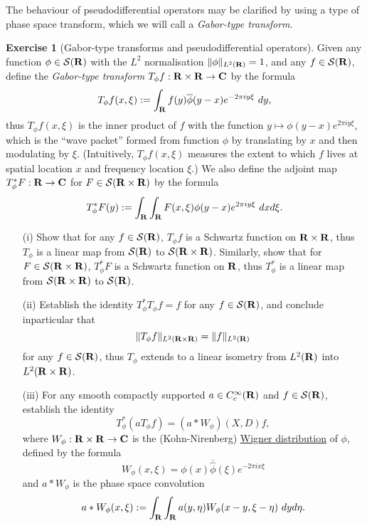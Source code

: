 \documentclass[11pt]{article}
\theoremstyle{definition}
\newtheorem{exercise}[theorem]{Exercise}
\begin{document}
The behaviour of pseudodifferential operators may be clarified by using a type of phase space transform, which we will call a \emph{Gabor-type transform}.

\begin{exercise}[Gabor-type transforms and pseudodifferential operators]
 \label{gabor} Given any function \({\phi \in {\mathcal S}({\bf R})}\) with the \({L^2}\) normalisation \({\|\phi\|_{L^2({\bf R})}=1}\), and any \({f \in {\mathcal S}({\bf R})}\), define the \emph{Gabor-type transform} \({T_\phi f: {\bf R} \times {\bf R} \rightarrow {\bf C}}\) by the formula 
\[\displaystyle  T_\phi f(x,\xi) := \int_{\bf R} f(y) \overline{\phi}(y-x) e^{-2\pi i y \xi}\ dy,\]
 thus \({T_\phi f(x,\xi)}\) is the inner product of \({f}\) with the function \({y \mapsto \phi(y-x) e^{2\pi i y \xi}}\), which is the “wave packet” formed from function \({\phi}\) by translating by \({x}\) and then modulating by \({\xi}\). (Intuitively, \({T_\phi f(x,\xi)}\) measures the extent to which \({f}\) lives at spatial location \({x}\) and frequency location \({\xi}\).) We also define the adjoint map \({T_\phi^* F: {\bf R} \rightarrow {\bf C}}\) for \({F \in {\mathcal S}({\bf R} \times {\bf R})}\) by the formula 
\[\displaystyle  T_\phi^* F(y) := \int_{\bf R} \int_{\bf R} F(x,\xi) \phi(y-x) e^{2\pi i y \xi}\ dx d\xi.\]
\begin{itemize}

\item[(i)] Show that for any \({f \in {\mathcal S}({\bf R})}\), \({T_\phi f}\) is a Schwartz function on \({{\bf R} \times {\bf R}}\), thus \({T_\phi}\) is a linear map from \({{\mathcal S}({\bf R})}\) to \({{\mathcal S}({\bf R} \times {\bf R})}\). Similarly, show that for \({F \in {\mathcal S}({\bf R} \times {\bf R})}\), \({T_\phi^* F}\) is a Schwartz function on \({{\bf R}}\), thus \({T_\phi^*}\) is a linear map from \({{\mathcal S}({\bf R} \times {\bf R})}\) to \({{\mathcal S}({\bf R})}\). 
\item[(ii)] Establish the identity \({T_\phi^* T_\phi f = f}\) for any \({f \in {\mathcal S}({\bf R})}\), and conclude inparticular that
\[\displaystyle  \| T_\phi f \|_{L^2({\bf R} \times {\bf R})} = \|f\|_{L^2({\bf R})} \]
 for any \({f \in {\mathcal S}({\bf R})}\), thus \({T_\phi}\) extends to a linear isometry from \({L^2({\bf R})}\) into \({L^2({\bf R} \times {\bf R})}\). 
\item[(iii)] For any smooth compactly supported \({a \in C^\infty_c({\bf R})}\) and \({f \in {\mathcal S}({\bf R})}\), establish the identity
\[\displaystyle  T_\phi^* (a T_\phi f) = (a*W_\phi)(X,D) f,\]
 where \({W_\phi: {\bf R} \times {\bf R} \rightarrow {\bf C}}\) is the (Kohn-Nirenberg) \href{https://en.wikipedia.org/wiki/Wigner_quasiprobability_distribution}{Wigner distribution} of \({\phi}\), defined by the formula 
\[\displaystyle  W_\phi(x,\xi) = \phi(x) \overline{\hat \phi}(\xi) e^{-2\pi i x \xi}\]
 and \({a*W_\phi}\) is the phase space convolution 
\[\displaystyle  a*W_\phi(x,\xi) := \int_{\bf R} \int_{\bf R} a(y,\eta) W_\phi(x-y, \xi-\eta)\ dy d\eta.\]


\end{itemize}

\end{exercise}
\end{document}
